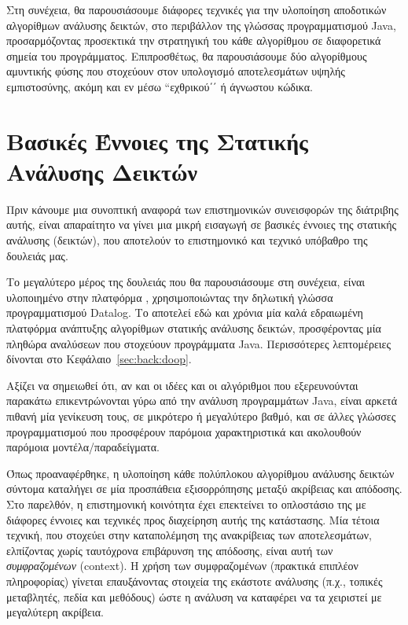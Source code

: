 Στη συνέχεια, θα παρουσιάσουμε διάφορες τεχνικές για την υλοποίηση αποδοτικών αλγορίθμων ανάλυσης δεικτών, στο περιβάλλον της γλώσσας προγραμματισμού {\en Java}, προσαρμόζοντας προσεκτικά την στρατηγική του κάθε αλγορίθμου σε διαφορετικά σημεία του προγράμματος. Επιπροσθέτως, θα παρουσιάσουμε δύο αλγορίθμους αμυντικής φύσης που στοχεύουν στον υπολογισμό αποτελεσμάτων υψηλής εμπιστοσύνης, ακόμη και εν μέσω ``εχθρικού΄΄ ή άγνωστου κώδικα.


\section*{Βασικές Έννοιες της Στατικής Ανάλυσης Δεικτών}

Πριν κάνουμε μια συνοπτική αναφορά των επιστημονικών συνεισφορών της διάτριβης αυτής, είναι απαραίτητο να γίνει μια μικρή εισαγωγή σε βασικές έννοιες της στατικής ανάλυσης (δεικτών), που αποτελούν το επιστημονικό και τεχνικό υπόβαθρο της δουλειάς μας.

Το μεγαλύτερο μέρος της δουλειάς που θα παρουσιάσουμε στη συνέχεια, είναι υλοποιημένο στην πλατφόρμα {\en \doop{}}\cite{oopsla:2009:Bravenboer}, χρησιμοποιώντας την δηλωτική γλώσσα προγραμματισμού {\en Datalog}. Το {\en \doop{}} αποτελεί εδώ και χρόνια μία καλά εδραιωμένη πλατφόρμα ανάπτυξης αλγορίθμων στατικής ανάλυσης δεικτών, προσφέροντας μία πληθώρα αναλύσεων που στοχεύουν προγράμματα {\en Java}. Περισσότερες λεπτομέρειες δίνονται στο Κεφάλαιο~\ref{sec:back:doop}.

Αξίζει να σημειωθεί ότι, αν και οι ιδέες και οι αλγόριθμοι που εξερευνούνται παρακάτω επικεντρώνονται γύρω από την ανάλυση προγραμμάτων {\en Java}, είναι αρκετά πιθανή μία γενίκευση τους, σε μικρότερο ή μεγαλύτερο βαθμό, και σε άλλες γλώσσες προγραμματισμού που προσφέρουν παρόμοια χαρακτηριστικά και ακολουθούν παρόμοια μοντέλα/παραδείγματα.


Όπως προαναφέρθηκε, η υλοποίηση κάθε πολύπλοκου αλγορίθμου ανάλυσης δεικτών σύντομα καταλήγει σε μία προσπάθεια εξισορρόπησης μεταξύ ακρίβειας και απόδοσης. Στο παρελθόν, η επιστημονική κοινότητα έχει επεκτείνει το οπλοστάσιο της με διάφορες έννοιες και τεχνικές προς διαχείρηση αυτής της κατάστασης. Μία τέτοια τεχνική, που στοχεύει στην καταπολέμηση της ανακρίβειας των αποτελεσμάτων, ελπίζοντας χωρίς ταυτόχρονα επιβάρυνση της απόδοσης, είναι αυτή των \emph{συμφραζομένων} ({\en context}). Η χρήση των συμφραζομένων (πρακτικά επιπλέον πληροφορίας) γίνεται επαυξάνοντας στοιχεία της εκάστοτε ανάλυσης (π.χ., τοπικές μεταβλητές, πεδία και μεθόδους) ώστε η ανάλυση να καταφέρει να τα χειριστεί με μεγαλύτερη ακρίβεια.

